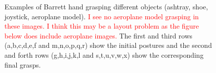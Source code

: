 \begin{figure}

  \caption{\scriptsize{Examples of Barrett hand grasping different objects (ashtray, shoe, joystick, aeroplane model).
\textcolor{red}{I see no aeroplane model grasping in these images. I think this may be a layout problem as the figure below does include aeroplane images.} 
 The first and third rows (a,b,c,d,e,f and m,n,o,p,q,r) show the initial postures and the second and forth rows (g,h,i,j,k,l and s,t,u,v,w,x) show the corresponding final grasps.}
}
    \label{barrett}
\end{figure}


